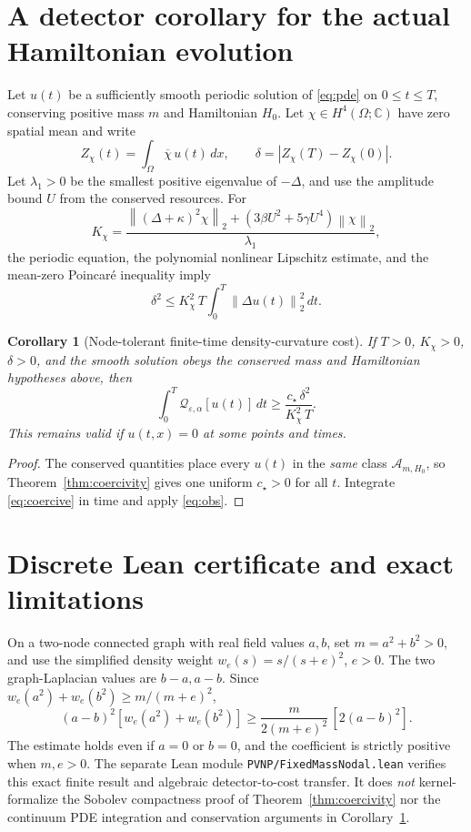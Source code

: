 \documentclass[11pt]{article}
\newtheorem{corollary}[theorem]{Corollary}
\newcommand{\dd}{\,dx}
\newcommand{\norm}[1]{\left\|#1\right\|}
\begin{document}
\section{A detector corollary for the actual Hamiltonian evolution}
Let \(u(t)\) be a sufficiently smooth periodic solution of
\eqref{eq:pde} on \(0\leq t\leq T\), conserving positive mass \(m\)
and Hamiltonian \(H_0\). Let \(\chi\in H^4(\Omega;\mathbb C)\) have
zero spatial mean and write
\[
Z_\chi(t)=\int_\Omega\overline\chi\,u(t)\dd,\qquad
\delta=|Z_\chi(T)-Z_\chi(0)|.
\]
Let \(\lambda_1>0\) be the smallest positive eigenvalue of
\(-\Delta\), and use the amplitude bound \(U\) from the conserved
resources. For
\[
K_\chi=
\frac{\norm{(\Delta+\kappa)^2\chi}_2+
(3\beta U^2+5\gamma U^4)\norm{\chi}_2}{\lambda_1},
\]
the periodic equation, the polynomial nonlinear Lipschitz estimate,
and the mean-zero Poincar\'e inequality imply
\begin{equation}
\label{eq:obs}
\delta^2\leq K_\chi^2\,T
\int_0^T\norm{\Delta u(t)}_2^2\,dt.
\end{equation}
\begin{corollary}[Node-tolerant finite-time density-curvature cost]
\label{cor:transport}
If \(T>0\), \(K_\chi>0\), \(\delta>0\), and the smooth solution obeys
the conserved mass and Hamiltonian hypotheses above, then
\begin{equation}
\boxed{\quad
\int_0^T\mathcal Q_{\varepsilon,\alpha}[u(t)]\,dt
\geq\frac{c_\star\,\delta^2}{K_\chi^2\,T}.\quad}
\end{equation}
This remains valid if \(u(t,x)=0\) at some points and times.
\end{corollary}
\begin{proof}
The conserved quantities place every \(u(t)\) in the \emph{same}
class \(\mathcal A_{m,H_0}\), so Theorem~\ref{thm:coercivity}
gives one uniform \(c_\star>0\) for all \(t\). Integrate
\eqref{eq:coercive} in time and apply \eqref{eq:obs}.
\end{proof}

\section{Discrete Lean certificate and exact limitations}
On a two-node connected graph with real field values \(a,b\), set
\(m=a^2+b^2>0\), and use the simplified density weight
\(w_e(s)=s/(s+e)^2\), \(e>0\).
The two graph-Laplacian values are \(b-a,a-b\). Since
\(w_e(a^2)+w_e(b^2)\geq m/(m+e)^2\),
\begin{equation}
\boxed{\quad
(a-b)^2[w_e(a^2)+w_e(b^2)]
\geq\frac{m}{2(m+e)^2}\,[2(a-b)^2].\quad}
\end{equation}
The estimate holds even if \(a=0\) or \(b=0\), and the
coefficient is strictly positive when \(m,e>0\).
The separate Lean module
\texttt{PVNP/FixedMassNodal.lean} verifies this exact finite result
and algebraic detector-to-cost transfer. It does \emph{not}
kernel-formalize the Sobolev compactness proof of
Theorem~\ref{thm:coercivity} nor the continuum PDE integration and
conservation arguments in Corollary~\ref{cor:transport}.
\end{document}

